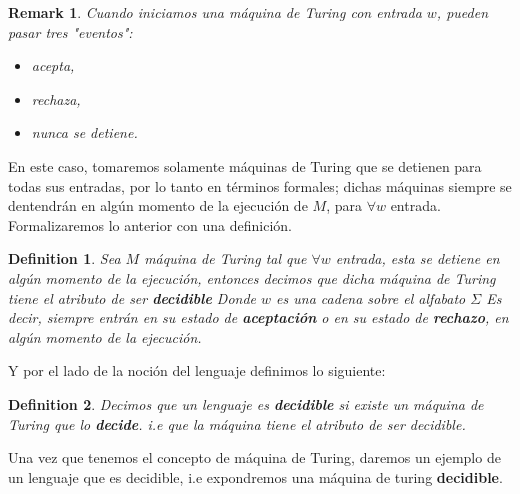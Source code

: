 \documentclass[10pt]{report}
\newtheorem*{remark}{Remark}
\newtheorem{definition}{Definition}
\begin{document}
{    \begin{remark}
        Cuando iniciamos una máquina de Turing con entrada $w$, pueden pasar tres "eventos":
        \begin{itemize}
            \item acepta,
            \item rechaza,
            \item nunca se detiene.
        \end{itemize}
    \end{remark}
    En este caso, tomaremos solamente máquinas de Turing que se detienen para todas sus entradas,
    por lo tanto en términos formales; dichas máquinas siempre se dentendrán en algún momento de la
    ejecución de $M$, para $\forall w$ entrada.
    Formalizaremos lo anterior con una definición.
    \begin{definition}
        Sea $M$ máquina de Turing tal que $\forall w$ entrada, esta se detiene en algún momento de la ejecución,
        entonces decimos que dicha máquina de Turing tiene el atributo de ser
        \textbf{decidible}\newline
        Donde $w$ es una cadena sobre el alfabato $\Sigma$
        Es decir, siempre entrán en su estado de \textbf{aceptación}
        o en su estado de \textbf{rechazo}, en algún momento de la ejecución.
    \end{definition}
    Y por el lado de la noción del lenguaje definimos lo siguiente:
    \begin{definition}
        Decimos que un lenguaje es \textbf{decidible} si existe un máquina de Turing
        que lo \textbf{decide}.
        i.e que la máquina tiene el atributo de ser decidible.
    \end{definition}
    Una vez que tenemos el concepto de máquina de Turing, daremos un ejemplo de un lenguaje que es decidible,
    i.e expondremos una máquina de turing \textbf{decidible}.

}
\end{document}
